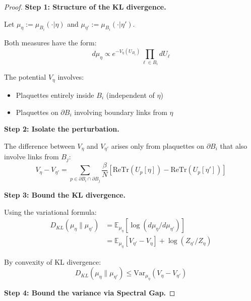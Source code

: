 \begin{proof}
\textbf{Step 1: Structure of the KL divergence.}

Let $\mu_\eta := \mu_{B_i}(\cdot | \eta)$ and $\mu_{\eta'} := \mu_{B_i}(\cdot | \eta')$.

Both measures have the form:
\[
d\mu_\eta \propto e^{-V_\eta(U_{B_i})} \prod_{\ell \in B_i} dU_\ell
\]

The potential $V_\eta$ involves:
\begin{itemize}
\item Plaquettes entirely inside $B_i$ (independent of $\eta$)
\item Plaquettes on $\partial B_i$ involving boundary links from $\eta$
\end{itemize}

\textbf{Step 2: Isolate the perturbation.}

The difference between $V_\eta$ and $V_{\eta'}$ arises only from plaquettes 
on $\partial B_i$ that also involve links from $B_j$:
\[
V_\eta - V_{\eta'} = \sum_{p \in \partial B_i \cap \partial B_j} \frac{\beta}{N} [\mathrm{Re}\mathrm{Tr}(U_p[\eta]) - \mathrm{Re}\mathrm{Tr}(U_p[\eta'])]
\]

\textbf{Step 3: Bound the KL divergence.}

Using the variational formula:
\begin{align}
D_{KL}(\mu_\eta \| \mu_{\eta'}) &= \mathbb{E}_{\mu_\eta}[\log(d\mu_\eta/d\mu_{\eta'})] \\
&= \mathbb{E}_{\mu_\eta}[V_{\eta'} - V_\eta] + \log(Z_{\eta'}/Z_\eta)
\end{align}

By convexity of KL divergence:
\[
D_{KL}(\mu_\eta \| \mu_{\eta'}) \leq \mathrm{Var}_{\mu_\eta}(V_\eta - V_{\eta'})
\]

\textbf{Step 4: Bound the variance via Spectral Gap.}


\end{proof}
